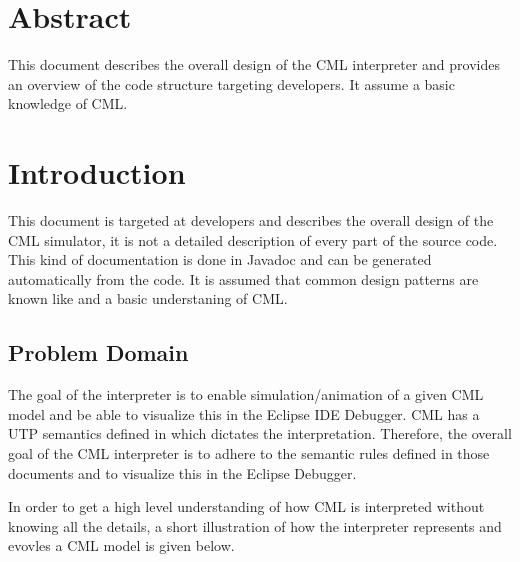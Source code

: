 \documentclass[a4paper, 10pt]{include/compassreport}   %
\begin{document}
\maketitle


\section*{Abstract}
\label{sec:abstract}

This document describes the overall design of the CML
interpreter and provides an overview of the code structure
targeting developers. It assume a basic knowledge of CML.

\newpage

\tableofcontents
\newpage

\section{Introduction}\label{sec:introduction}
This document is targeted at developers and describes the overall
design of the CML simulator, it is not a detailed description of every
part of the source code. This kind of documentation is done in Javadoc
and can be generated automatically from the code. It is assumed that
common design patterns are known like \cite{gof&94} and a basic
understaning of CML.

\subsection{Problem Domain}\label{sec:problem_domain}
The goal of the interpreter is to enable simulation/animation of a
given CML \nocite{cmlsyntax:online} model and be able to visualize this in the
Eclipse IDE Debugger. CML has a UTP semantics defined in
\cite{Bryans&12} which dictates the interpretation. Therefore, the
overall goal of the CML interpreter is to adhere to the semantic rules
defined in those documents and to visualize this in the Eclipse
Debugger.

In order to get a high level understanding of how CML is interpreted
without knowing all the details, a short illustration of how the interpreter
represents and evovles a CML model is given below.
\end{document}
